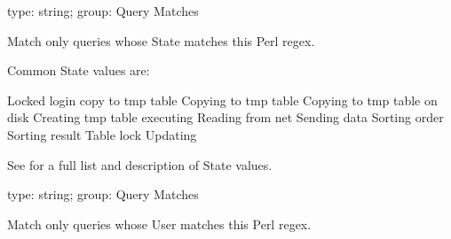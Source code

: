 \documentclass[letterpaper,10pt,english]{sphinxmanual}
\begin{document}
\begin{fulllineitems}
\label{\detokenize{mariadb-kill:cmdoption-mariadb-kill-match-state}}
\sphinxAtStartPar
type: string; group: Query Matches

\sphinxAtStartPar
Match only queries whose State matches this Perl regex.

\sphinxAtStartPar
Common State values are:

\begin{sphinxVerbatim}[commandchars=\\\{\}]
Locked
login
copy to tmp table
Copying to tmp table
Copying to tmp table on disk
Creating tmp table
executing
Reading from net
Sending data
Sorting  order
Sorting result
Table lock
Updating
\end{sphinxVerbatim}

\sphinxAtStartPar
See  for
a full list and description of State values.

\end{fulllineitems}


\begin{fulllineitems}
\label{\detokenize{mariadb-kill:cmdoption-mariadb-kill-match-user}}
\sphinxAtStartPar
type: string; group: Query Matches

\sphinxAtStartPar
Match only queries whose User matches this Perl regex.

\end{fulllineitems}

\end{document}
